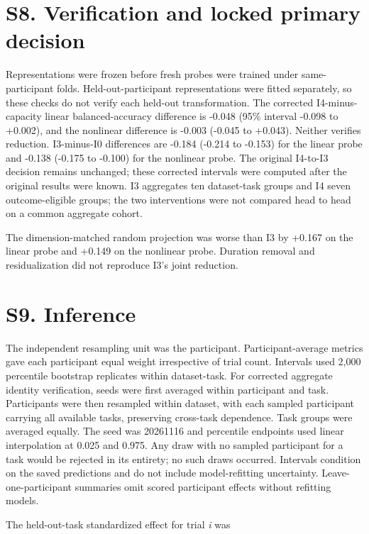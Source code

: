 \documentclass[11pt]{article}
\begin{document}
\section{S8. Verification and locked primary
decision}\label{s8.-verification-and-locked-primary-decision}

Representations were frozen before fresh probes were trained under
same-participant folds. Held-out-participant representations were fitted
separately, so these checks do not verify each held-out transformation.
The corrected I4-minus-capacity linear balanced-accuracy difference is
-0.048 (95\% interval -0.098 to +0.002), and the nonlinear difference is
-0.003 (-0.045 to +0.043). Neither verifies reduction. I3-minus-I0
differences are -0.184 (-0.214 to -0.153) for the linear probe and
-0.138 (-0.175 to -0.100) for the nonlinear probe. The original I4-to-I3
decision remains unchanged; these corrected intervals were computed
after the original results were known. I3 aggregates ten dataset-task
groups and I4 seven outcome-eligible groups; the two interventions were
not compared head to head on a common aggregate cohort.

The dimension-matched random projection was worse than I3 by +0.167 on
the linear probe and +0.149 on the nonlinear probe. Duration removal and
residualization did not reproduce I3's joint reduction.

\section{S9. Inference}\label{s9.-inference}

The independent resampling unit was the participant. Participant-average
metrics gave each participant equal weight irrespective of trial count.
Intervals used 2,000 percentile bootstrap replicates within
dataset-task. For corrected aggregate identity verification, seeds were
first averaged within participant and task. Participants were then
resampled within dataset, with each sampled participant carrying all
available tasks, preserving cross-task dependence. Task groups were
averaged equally. The seed was 20261116 and percentile endpoints used
linear interpolation at 0.025 and 0.975. Any draw with no sampled
participant for a task would be rejected in its entirety; no such draws
occurred. Intervals condition on the saved predictions and do not
include model-refitting uncertainty. Leave-one-participant summaries
omit scored participant effects without refitting models.

The held-out-task standardized effect for trial \emph{i} was
\end{document}
